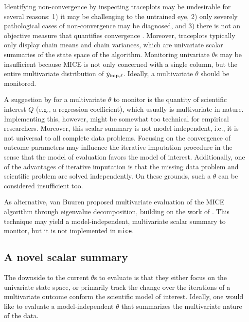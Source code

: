 \documentclass[Royal,times,sageh]{sagej}
\begin{document}
Identifying non-convergence by inspecting traceplots may be undesirable for several reasons: 1) it may be challenging to the untrained eye, 2) only severely pathological cases of non-convergence may be diagnosed, and 3) there is not an objective measure that quantifies convergence \citep[\(\S\) 6.5.2]{buur18}. Moreover, traceplots typically only display chain means and chain variances, which are univariate scalar summaries of the state space of the algorithm. Monitoring univariate \(\theta\)s may be insufficient because MICE is not only concerned with a single column, but the entire multivariate distribution of \(\dot y_{\rm imp, \ell}\). Ideally, a multivariate \(\theta\) should be monitored.

A suggestion by \citet{buur18} for a multivariate \(\theta\) to monitor is the quantity of scientific interest \(Q\) (e.g., a regression coefficient), which usually is multivariate in nature. Implementing this, however, might be somewhat too technical for empirical researchers. Moreover, this scalar summary is not model-independent, i.e., it is not universal to all complete data problems. Focusing on the convergence of outcome parameters may influence the iterative imputation procedure in the sense that the model of evaluation favors the model of interest. Additionally, one of the advantages of iterative imputation is that the missing data problem and scientific problem are solved independently. On these grounds, such a \(\theta\) can be considered insufficient too.

As alternative, van Buuren \citeyearpar[\(\S\) 4.5.2]{buur18} proposed multivariate evaluation of the MICE algorithm through eigenvalue decomposition, building on the work of \citet{mack03}. This technique may yield a model-independent, multivariate scalar summary to monitor, but it is not implemented in \texttt{mice}.

\hypertarget{a-novel-scalar-summary}{%
\subsection{A novel scalar summary}\label{a-novel-scalar-summary}}

The downside to the current \(\theta\)s to evaluate is that they either focus on the univariate state space, or primarily track the change over the iterations of a multivariate outcome conform the scientific model of interest. Ideally, one would like to evaluate a model-independent \(\theta\) that summarizes the multivariate nature of the data.
\end{document}
